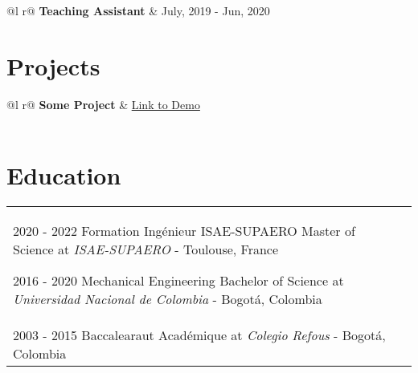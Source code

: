 \documentclass[a4paper,12pt]{article}
\begin{document}
\begin{tabularx}{\linewidth}{ @{}l r@{} }
\textbf{Teaching Assistant} & \hfill July, 2019 - Jun, 2020 \\[3.75pt]

\end{tabularx}

\section{Projects}

\begin{tabularx}{\linewidth}{ @{}l r@{} }
\textbf{Some Project} & \hfill \href{https://some-link.com}{Link to Demo} \\[3.75pt]
  \\
\end{tabularx}

\section{Education}
\begin{tabularx}{\linewidth}{@{}l X@{}}	
2020 - 2022 Formation Ingénieur ISAE-SUPAERO Master of Science at \textit{ISAE-SUPAERO} - Toulouse, France

2016 - 2020 Mechanical Engineering Bachelor of Science at \textit{Universidad Nacional de Colombia} - Bogotá, Colombia \\

2003 - 2015 Baccalearaut Académique at \textit{Colegio Refous} - Bogotá, Colombia \\
\end{tabularx}

\end{document}
